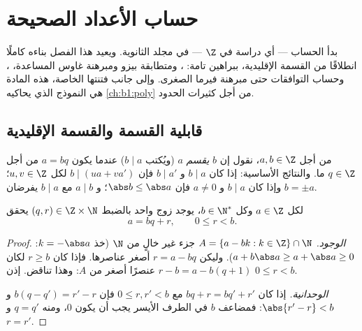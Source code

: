 \chapter{حساب الأعداد الصحيحة}\label{ch:b1:arith}

بدأ الحساب --- أي دراسة  في $\Z$ --- في
مجلد الثانوية. ويعيد هذا الفصل بناءه كاملًا انطلاقًا من
القسمة الإقليدية، ببراهين تامة: 
، ومتطابقة بيزو ومبرهنة غاوس المساعدة، ، وحساب التوافقات حتى مبرهنة فيرما
الصغرى. وإلى جانب فتنتها الخاصة، هذه المادة هي النموذج الذي
يحاكيه \cref{ch:b1:poly} من أجل كثيرات الحدود.

\section{قابلية القسمة والقسمة الإقليدية}

\begin{definition}\label{def:b1:arith:divides}
من أجل $a, b \in \Z$، نقول إن $b$ \emph{يقسم} $a$ (ويُكتب $b \mid
a$) عندما يكون $a = bq$ من أجل $q \in \Z$ ما. والنتائج
الأساسية: إذا كان $b \mid a$ و $b \mid a'$ فإن $b \mid (ua + va')$
لكل $u, v \in \Z$؛ وإذا كان $b \mid a$ و $a \neq 0$ فإن $\abs b \leq
\abs a$؛ و $a \mid b$ مع $b \mid a$ يفرضان $b = \pm a$.
\end{definition}

\begin{theorem}\label{thm:b1:arith:division}
لكل $a \in \Z$ وكل $b \in \N^*$، يوجد زوج واحد بالضبط $(q, r)
\in \Z \times \N$ يحقق
\[
a = bq + r, \qquad 0 \leq r < b .
\]
\end{theorem}

\begin{proof}
\emph{الوجود.}  $A = \{a - bk : k \in \Z\} \cap \N$ جزء
غير خالٍ من $\N$ (خذ $k = -\abs a$: $a + b\abs a \geq a +
\abs a \geq 0$). وليكن $r = a - bq$ أصغر عناصرها. فإذا كان $r \geq b$
لكان $r - b = a - b(q+1)$ عنصرًا أصغر من $A$:
وهذا تناقض. إذن $0 \leq r < b$.

\emph{الوحدانية.} إذا كان $bq + r = bq' + r'$ مع $0 \leq r, r' < b$
فإن $b(q - q') = r' - r$ و $\abs{r' - r} < b$: فمضاعف $b$
في الطرف الأيسر يجب أن يكون $0$، ومنه $q = q'$ و $r = r'$.
\end{proof}

